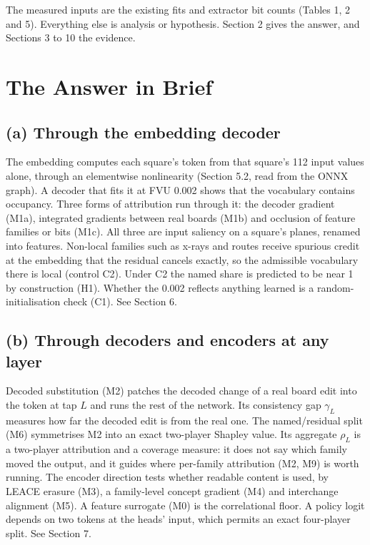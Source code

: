 \documentclass[conference]{IEEEtran}
\begin{document}
The measured inputs are the existing fits and extractor bit counts (Tables 1, 2 and 5). Everything else is analysis or hypothesis. Section 2 gives the answer, and Sections 3 to 10 the evidence.

\section{The Answer in Brief}\label{sec:2}
\subsection{(a) Through the embedding decoder}\label{sec:2.1}
The embedding computes each square's token from that square's 112 input values alone, through an elementwise nonlinearity (Section 5.2, read from the ONNX graph). A decoder that fits it at FVU 0.002 shows that the vocabulary contains occupancy. Three forms of attribution run through it: the decoder gradient (M1a), integrated gradients between real boards (M1b) and occlusion of feature families or bits (M1c). All three are input saliency on a square's planes, renamed into features. Non-local families such as x-rays and routes receive spurious credit at the embedding that the residual cancels exactly, so the admissible vocabulary there is local (control C2). Under C2 the named share is predicted to be near 1 by construction (H1). Whether the 0.002 reflects anything learned is a random-initialisation check (C1). See Section 6.

\subsection{(b) Through decoders and encoders at any layer}\label{sec:2.2}
Decoded substitution (M2) patches the decoded change of a real board edit into the token at tap $L$ and runs the rest of the network. Its consistency gap $\gamma_L$ measures how far the decoded edit is from the real one. The named/\allowbreak{}residual split (M6) symmetrises M2 into an exact two-player Shapley value. Its aggregate $\rho_L$ is a two-player attribution and a coverage measure: it does not say which family moved the output, and it guides where per-family attribution (M2, M9) is worth running. The encoder direction tests whether readable content is used, by LEACE erasure (M3), a family-level concept gradient (M4) and interchange alignment (M5). A feature surrogate (M0) is the correlational floor. A policy logit depends on two tokens at the heads' input, which permits an exact four-player split. See Section 7.
\end{document}
